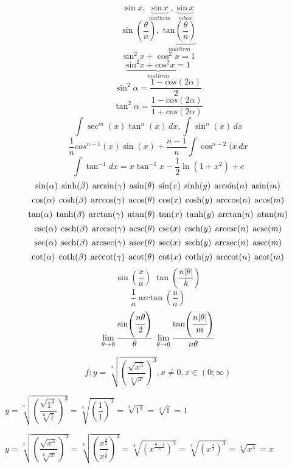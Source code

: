 \documentclass[12pt]{article}
\begin{document}
\setlength{\parindent}{0pt}

\[ \sin x ,\; \underbrace{\mathrm{sin}\,x}_{mathrm},\; \underbrace{\mbox{sin}\, x}_{mbox} \]
\[ \sin\!\left(\frac{\theta}{n}\right),\; \underbrace{\mathrm{tan}\!\left(\frac{\theta}{n}\right)}_{mathrm} \]
\[ \sin^2\!x + \cos^2 \!x = 1 \]
\[ \underbrace{\mathrm{sin}^2 x + \mathrm{cos}^2 x = 1 }_{mathrm} \]
\vspace{1em}
\[ \sin^2\alpha = \frac{1-cos(2\alpha)}{2} \]
\[ \tan^2\alpha = \frac{1-cos(2\alpha)}{1+cos(2\alpha)} \]
\[ \int \sec^m(x) \tan^n(x)\,dx, \int \sin^n(x)\,dx \]
\[ \frac{1}{n}cos^{n-1}(x)\sin(x) + \frac{n-1}{n}\int \cos^{n-2}(x\,dx \]
\[ \int\tan^{-1}dx=x\tan^{-1}x-\frac{1}{2}\ln\left(1+x^2\right) +c \]  
\vspace{1em}
\[ \sin(\alpha)\; \sinh(\beta)\;\arcsin(\gamma)\;\asin(\theta)\;\sine(x)\;\hypsine(y)\;\arcsine(n)\;\asine(m)\]
\[ \cos(\alpha)\;\cosh(\beta)\;\arccos(\gamma)\;\acos(\theta)\;\cosine(x)\;\hypcosine(y)\;\arccosine(n)\;\acosine(m) \]
\[ \tan(\alpha)\;\tanh(\beta)\;\arctan(\gamma)\;\atan(\theta)\;\tangent(x)\;\hyptangent(y)\;\arctangent(n)\;\atangent(m) \]
\[ \csc(\alpha)\;\csch(\beta)\;\arccsc(\gamma)\;\acsc(\theta)\;\cosecant(x)\;\hypcosecant(y)\;\arccosecant(n)\;\acosecant(m) \]
\[ \sec(\alpha)\;\sech(\beta)\;\arcsec(\gamma)\;\asec(\theta)\;\secant(x)\;\hypsecant(y)\;\arcsecant(n)\;\asecant(m) \]
\[ \cot(\alpha)\;\coth(\beta)\;\arccot(\gamma)\;\acot(\theta)\;\cotangent(x)\;\hypcotangent(y)\;\arccotangent(n)\;\acotangent(m) \]
\vspace{1em}
\[ \sin(\frac{x}{a})\;\tan(\frac{n|\theta|}{k})\]
\[ \frac{1}{a}\arctan(\frac{u}{a})\]
\[ \lim_{\theta \to 0}\frac{\sin(\cfrac{n\theta}{2})}{\theta}\;\lim_{\theta \to 0}\frac{\tan(\cfrac{n|\theta|}{m})}{n\theta}\]

\newpage

\begin{equation*}
    f:y=\sqrt[4]{\left(\dfrac{\sqrt{x^3}}{\sqrt[6]{x}}\right)^3}, x\neq 0, x\in\left(0;\infty\right)
\end{equation*}

\begin{math}
    y=\sqrt[4]{\left(\dfrac{\sqrt{1^3}}{\sqrt[6]{1}}\right)^3}=\sqrt[4]{\left(\dfrac{1}{1}\right)^3}=\sqrt[4]{1^3}=\sqrt[4]{1}=1
\end{math}

\begin{math}
    y=\sqrt[4]{\left(\dfrac{\sqrt{x^3}}{\sqrt[6]{x}}\right)^3}=\sqrt[4]{\left(\dfrac{x^{\frac{3}{2}}}{x^{\frac{1}{6}}}\right)^3}=\sqrt[4]{\left(x^{\frac{9-1}{6}}\right)^3}=\sqrt[4]{\left(x^{\frac{4}{3}}\right)^3}=\sqrt[4]{x^4}=x
\end{math}
\end{document}
